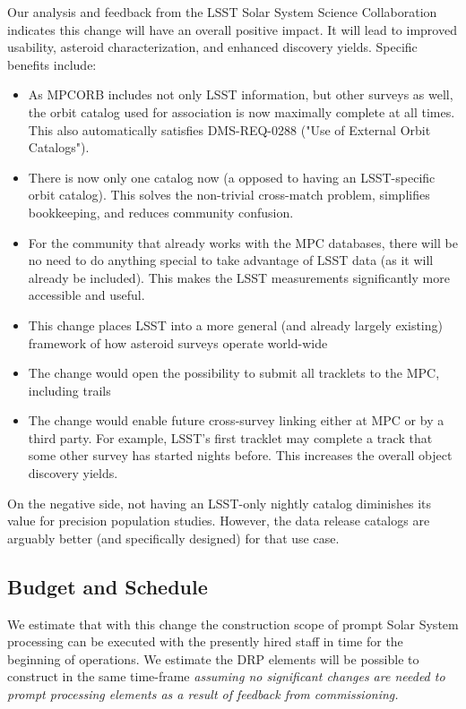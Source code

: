 \documentclass[DM,authoryear,toc,lsstdraft]{lsstdoc}
\begin{document}
Our analysis and feedback from the LSST Solar System Science Collaboration indicates this change will have an overall positive impact. It will lead to improved usability, asteroid characterization, and enhanced discovery yields. Specific benefits include:
%
\begin{itemize}
\item As MPCORB includes not only LSST information, but other surveys as well, the orbit catalog used for association is now maximally complete at all times. This also automatically satisfies DMS-REQ-0288 ("Use of External Orbit Catalogs").
\item There is now only one catalog now (a opposed to having an LSST-specific orbit catalog). This solves the non-trivial cross-match problem, simplifies bookkeeping, and reduces community confusion.
\item For the community that already works with the MPC databases, there will be no need to do anything special to take advantage of LSST data (as it will already be included). This makes the LSST measurements significantly more accessible and useful.
\item This change places LSST into a more general (and already largely existing) framework of how asteroid surveys operate
world-wide
\item The change would open the possibility to submit all tracklets to the MPC, including trails
\item The change would enable future cross-survey linking either at MPC or by a third party. For example, LSST’s first tracklet may complete a track that some other survey has started nights before. This increases the overall object discovery yields.
\end{itemize}

On the negative side, not having an LSST-only nightly catalog diminishes its value for precision population studies. However, the data release catalogs are arguably better (and specifically designed) for that use case.

\subsection{Budget and Schedule}

We estimate that with this change the construction scope of prompt Solar System processing can be executed with the presently hired staff in time for the beginning of operations. We estimate the DRP elements will be possible to construct in the same time-frame {\em assuming no significant changes are needed to prompt processing elements as a result of feedback from commissioning.}
\end{document}
